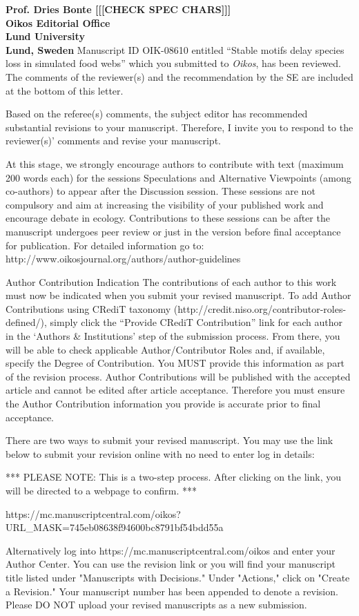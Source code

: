 \documentclass[12pt]{letter}
\begin{document}
\begin{letter}{\bf Prof. Dries Bonte [[[CHECK SPEC CHARS]]]\\
Oikos Editorial Office \\
Lund University \\
Lund, Sweden}
Manuscript ID OIK-08610 entitled ``Stable motifs delay species loss in simulated food webs'' which you submitted to \emph{Oikos}, has been reviewed.  The comments of the reviewer(s) and the recommendation by the SE are included at the bottom of this letter.

Based on the referee(s) comments, the subject editor has recommended substantial revisions to your manuscript.  Therefore, I invite you to respond to the reviewer(s)' comments and revise your manuscript.

At this stage, we strongly encourage authors to contribute with text (maximum 200 words each) for the sessions Speculations and Alternative Viewpoints (among co-authors) to appear after the Discussion session.  These sessions are not compulsory and aim at increasing the visibility of your published work and encourage debate in ecology. Contributions to these sessions can be after the manuscript undergoes peer review or just in the version before final acceptance for publication.   For detailed information go to: http://www.oikosjournal.org/authors/author-guidelines

Author Contribution Indication
The contributions of each author to this work must now be indicated when you submit your revised manuscript. To add Author Contributions using CRediT taxonomy (http://credit.niso.org/contributor-roles-defined/), simply click the ``Provide CRediT Contribution'' link for each author in the ‘Authors & Institutions’ step of the submission process. From there, you will be able to check applicable Author/Contributor Roles and, if available, specify the Degree of Contribution. You MUST provide this information as part of the revision process. Author Contributions will be published with the accepted article and cannot be edited after article acceptance. Therefore you must ensure the Author Contribution information you provide is accurate prior to final acceptance.

There are two ways to submit your revised manuscript. You may use the link below to submit your revision online with no need to enter log in details:

*** PLEASE NOTE: This is a two-step process. After clicking on the link, you will be directed to a webpage to confirm. ***

https://mc.manuscriptcentral.com/oikos?URL_MASK=745eb08638f94600bc8791bf54bdd55a

Alternatively log into https://mc.manuscriptcentral.com/oikos and enter your Author Center. You can use the revision link or you will find your manuscript title listed under "Manuscripts with Decisions."  Under "Actions," click on "Create a Revision."  Your manuscript number has been appended to denote a revision.  Please DO NOT upload your revised manuscripts as a new submission.


\end{letter}
\end{document}
